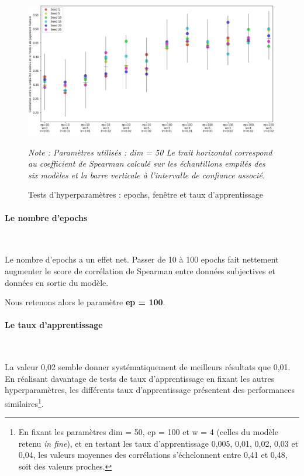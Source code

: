 \documentclass[11pt,french,french]{article}
\let\rmarkdownfootnote\footnote%
\def\footnote{\protect\rmarkdownfootnote}
\begin{document}
\begin{figure}
\begin{center}
\includegraphics[width=1\textwidth]{img/test_parametres.png}
\captionsetup{margin=0cm,format=hang,justification=justified}
\caption{Tests d'hyperparamètres : epochs, fenêtre et taux d'apprentissage}\label{fig:evaluation_1}
\end{center}
\vspace{-0.3cm}
\footnotesize
\emph{Note : Paramètres utilisés : dim = 50\newline
Le trait horizontal correspond au coefficient de Spearman calculé sur les échantillons empilés des six modèles et la barre verticale à l'intervalle de confiance associé.}
\end{figure}

\paragraph{Le nombre d'epochs}\label{le-nombre-depochs}

~

Le nombre d'epochs a un effet net. Passer de 10 à 100 epochs fait
nettement augmenter le score de corrélation de Spearman entre données
subjectives et données en sortie du modèle.

\faArrowCircleRight{} Nous retenons alors le paramètre \textbf{ep =
100}.

\paragraph{Le taux d'apprentissage}\label{le-taux-dapprentissage}

~

La valeur 0,02 semble donner systématiquement de meilleurs résultats que
0,01. En réalisant davantage de tests de taux d'apprentissage en fixant
les autres hyperparamètres, les différents taux d'apprentissage
présentent des performances similaires\footnote{En fixant les paramètres
  dim = 50, ep = 100 et w = 4 (celles du modèle retenu \emph{in fine}),
  et en testant les taux d'apprentissage 0,005, 0,01, 0,02, 0,03 et
  0,04, les valeurs moyennes des corrélations s'échelonnent entre 0,41
  et 0,48, soit des valeurs proches.}.
\end{document}

